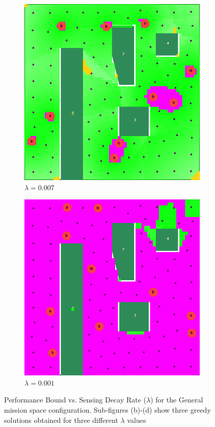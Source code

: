 \documentclass[conference]{IEEEtran}
\begin{document}
\begin{figure}[t]
\begin{subfigure}[t]{0.105\textwidth}
        \includegraphics[width=\textwidth]{Figures/Gen2_2.png}
        \caption{$\lambda=0.007$}
    \end{subfigure}\hspace{3mm}
    \begin{subfigure}[t]{0.105\textwidth}
        \centering
        \includegraphics[width=\textwidth]{Figures/Gen2_3.png}
        \caption{$\lambda=0.001$}
    \end{subfigure}
    \caption{Performance Bound vs. Sensing Decay Rate ($\lambda$) for the General mission space configuration. Sub-figures (b)-(d) show three greedy solutions obtained for three different $\lambda$ values}
    \label{Fig:GeneralConfigBetaVsDecay}
\end{figure}
\end{document}
